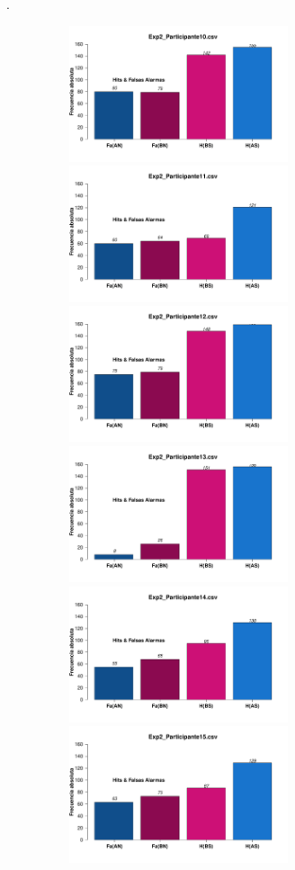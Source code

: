 \documentclass[a4paper ]{article}
\begin{document}
\vfill .
\begin{figure}[th]
\begin{center}
\includegraphics[width=8cm, height=4cm]{Figures/MirrorRate_Exp2_P10} \includegraphics[width=8cm, height=4cm]{Figures/MirrorRate_Exp2_P11} \includegraphics[width=8cm, height=4cm]{Figures/MirrorRate_Exp2_P12}
\includegraphics[width=8cm, height=4cm]{Figures/MirrorRate_Exp2_P13} \includegraphics[width=8cm, height=4cm]{Figures/MirrorRate_Exp2_P14} \includegraphics[width=8cm, height=4cm]{Figures/MirrorRate_Exp2_P15}

\end{center}
\end{figure}
\end{document}
